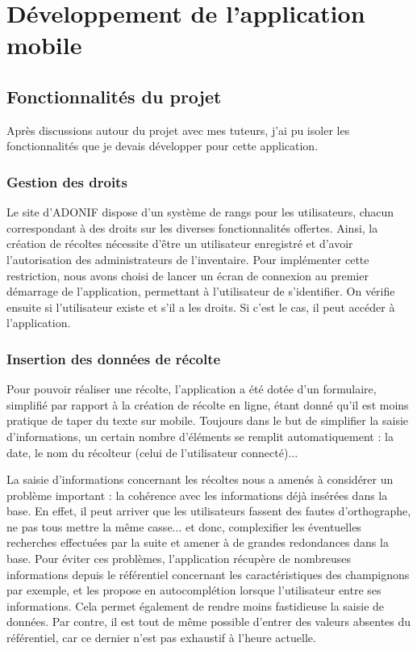 \documentclass[11pt, a4paper, twoside]{report}
\begin{document}
\section{Développement de l'application mobile}
\subsection{Fonctionnalités du projet}
Après discussions autour du projet avec mes tuteurs, j'ai pu isoler les fonctionnalités que je devais développer pour cette application.

\subsubsection{Gestion des droits}

Le site d'ADONIF dispose d'un système de rangs pour les utilisateurs, chacun correspondant à des droits sur les diverses fonctionnalités offertes. Ainsi, la création de récoltes nécessite d'être un utilisateur enregistré et d'avoir l'autorisation des 
administrateurs de l'inventaire. Pour implémenter cette restriction, nous avons choisi de lancer un écran de connexion au premier démarrage de l'application, permettant à l'utilisateur de s'identifier. On vérifie ensuite si l'utilisateur existe et s'il a les droits. Si c'est le cas, il peut accéder à l'application.

\subsubsection{Insertion des données de récolte}

Pour pouvoir réaliser une récolte, l'application a été dotée d'un formulaire, simplifié par rapport à la création de récolte en ligne, étant donné qu'il est moins pratique de taper du texte sur mobile. Toujours dans le but de simplifier la saisie d'informations, un certain nombre d'éléments se remplit automatiquement : la date, le nom du récolteur (celui de l'utilisateur connecté)...

La saisie d'informations concernant les récoltes nous a amenés à considérer un problème important : la cohérence avec les informations déjà insérées dans la base. En effet, il peut arriver que les utilisateurs fassent des fautes d'orthographe, ne pas tous mettre la même casse... et donc, complexifier les éventuelles recherches effectuées par la suite et amener à de grandes redondances dans la base. 
Pour éviter ces problèmes, l'application récupère de nombreuses informations depuis le référentiel concernant les caractéristiques des champignons par exemple, et les propose en autocomplétion lorsque l'utilisateur entre ses informations. Cela permet également de rendre moins fastidieuse la saisie de données. Par contre, il est tout de même possible d'entrer des valeurs absentes du référentiel, car ce dernier n'est pas exhaustif à l'heure actuelle.
\end{document}
